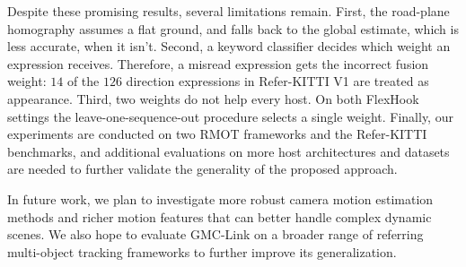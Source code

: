 \documentclass{article}
\begin{document}
Despite these promising results, several limitations remain. First, the road-plane homography assumes a flat ground, and falls back to the global estimate, which is less accurate, when it isn't. Second, a keyword classifier decides which weight an expression receives. Therefore, a misread expression gets the incorrect fusion weight: $14$ of the $126$ direction expressions in Refer-KITTI V1 are treated as appearance. Third, two weights do not help every host. On both FlexHook settings the leave-one-sequence-out procedure selects a single weight. Finally, our experiments are conducted on two RMOT frameworks and the Refer-KITTI benchmarks, and additional evaluations on more host architectures and datasets are needed to further validate the generality of the proposed approach.

In future work, we plan to investigate more robust camera motion estimation methods and richer motion features that can better handle complex dynamic scenes. We also hope to evaluate GMC-Link on a broader range of referring multi-object tracking frameworks to further improve its generalization.



\end{document}
